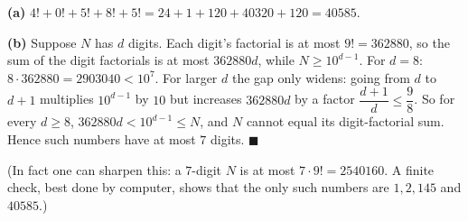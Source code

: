 \textbf{(a)} $4!+0!+5!+8!+5!=24+1+120+40320+120=40585$. \checkmark

\textbf{(b)} Suppose $N$ has $d$ digits. Each digit's factorial is at most $9!=362880$, so the sum of the digit factorials is at most $362880d$, while $N\ge10^{d-1}$. For $d=8$: $8\cdot362880=2903040<10^7$. For larger $d$ the gap only widens: going from $d$ to $d+1$ multiplies $10^{d-1}$ by $10$ but increases $362880d$ by a factor $\dfrac{d+1}{d}\le\dfrac{9}{8}$. So for every $d\ge8$, $362880d<10^{d-1}\le N$, and $N$ cannot equal its digit-factorial sum. Hence such numbers have at most $7$ digits. $\blacksquare$

(In fact one can sharpen this: a $7$-digit $N$ is at most $7\cdot9!=2540160$. A finite check, best done by computer, shows that the only such numbers are $1,2,145$ and $40585$.)
